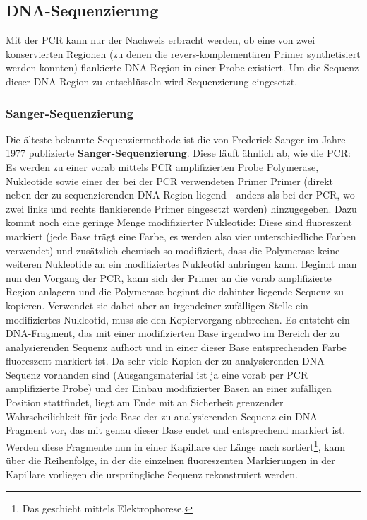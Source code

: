 \subsection{DNA-Sequenzierung}

Mit der PCR kann nur der Nachweis erbracht werden, ob eine von zwei konservierten Regionen (zu denen die revers-komplementären Primer synthetisiert werden konnten) flankierte DNA-Region in einer Probe existiert. Um die Sequenz dieser DNA-Region zu entschlüsseln wird Sequenzierung eingesetzt. 

\subsubsection{Sanger-Sequenzierung}

Die älteste bekannte Sequenziermethode ist die von Frederick Sanger im Jahre 1977 publizierte \textbf{Sanger-Sequenzierung}. Diese läuft ähnlich ab, wie die PCR: Es werden zu einer vorab mittels PCR amplifizierten Probe Polymerase, Nukleotide sowie einer der bei der PCR verwendeten Primer Primer (direkt neben der zu sequenzierenden DNA-Region liegend - anders als bei der PCR, wo zwei links und rechts flankierende Primer eingesetzt werden) hinzugegeben. Dazu kommt noch eine geringe Menge modifizierter Nukleotide: Diese sind fluoreszent markiert (jede Base trägt eine Farbe, es werden also vier unterschiedliche Farben verwendet) und zusätzlich chemisch so modifiziert, dass die Polymerase keine weiteren Nukleotide an ein modifiziertes Nukleotid anbringen kann. Beginnt man nun den Vorgang der PCR, kann sich der Primer an die vorab amplifizierte Region anlagern und die Polymerase beginnt die dahinter liegende Sequenz zu kopieren. Verwendet sie dabei aber an irgendeiner zufälligen Stelle ein modifiziertes Nukleotid, muss sie den Kopiervorgang abbrechen. Es entsteht ein DNA-Fragment, das mit einer modifizierten Base irgendwo im Bereich der zu analysierenden Sequenz aufhört und in einer dieser Base entsprechenden Farbe fluoreszent markiert ist. Da sehr viele Kopien der zu analysierenden DNA-Sequenz vorhanden sind (Ausgangsmaterial ist ja eine vorab per PCR amplifizierte Probe) und der Einbau modifizierter Basen an einer zufälligen Position stattfindet, liegt am Ende mit an Sicherheit grenzender Wahrscheilichkeit für jede Base der zu analysierenden Sequenz ein DNA-Fragment vor, das mit genau dieser Base endet und entsprechend markiert ist. Werden diese Fragmente nun in einer Kapillare der Länge nach sortiert\footnote{Das geschieht mittels Elektrophorese.}, kann über die Reihenfolge, in der die einzelnen fluoreszenten Markierungen in der Kapillare vorliegen die ursprüngliche Sequenz rekonstruiert werden. 

